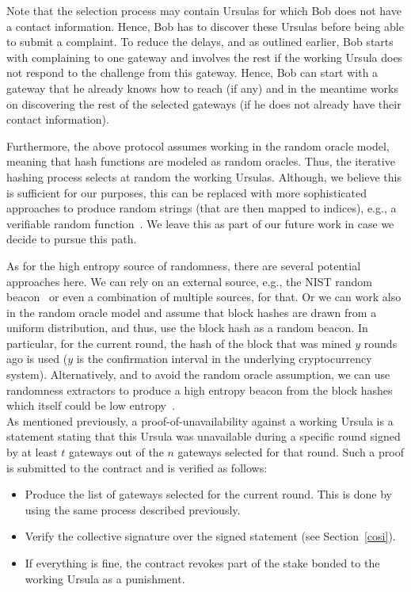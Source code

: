 Note that the selection process may contain Ursulas for which Bob does not have a contact information. Hence, Bob has to discover these Ursulas before being able to submit a complaint. To reduce the delays, and as outlined earlier, Bob starts with complaining to one gateway and involves the rest if the working Ursula does not respond to the challenge from this gateway. Hence, Bob can start with a gateway that he already knows how to reach (if any) and in the meantime works on discovering the rest of the selected gateways (if he does not already have their contact information).


Furthermore, the above protocol assumes working in the random oracle model, meaning that hash functions are modeled as random oracles. Thus, the iterative hashing process selects at random the working Ursulas. Although, we believe this is sufficient for our purposes, this can be replaced with more sophisticated approaches to produce random strings (that are then mapped to indices), e.g., a verifiable random function~\cite{micali1999verifiable}. We leave this as part of our future work in case we decide to pursue this path. 


As for the high entropy source of randomness, there are several potential approaches here. We can rely on an external source, e.g., the NIST random beacon~\cite{nist-beacon} or even a combination of multiple sources, for that. Or we can work also in the random oracle model and assume that block hashes are drawn from a uniform distribution, and thus, use the block hash as a random beacon. In particular, for the current round, the hash of the block that was mined $y$ rounds ago is used ($y$ is the confirmation interval in the underlying cryptocurrency system). Alternatively, and to avoid the random oracle assumption, we can use randomness extractors to produce a high entropy beacon from the block hashes which itself could be low entropy~\cite{bonneau2015bitcoin}. \\


 As mentioned previously, a proof-of-unavailability against a working Ursula is a statement stating that this Ursula was unavailable during a specific round signed by at least $t$ gateways out of the $n$ gateways selected for that round. Such a proof is submitted to the \stakeescrow contract and is verified as follows:
\begin{itemize}
\item Produce the list of gateways selected for the current round. This is done by using the same process described previously.

\item Verify the collective signature over the signed statement (see Section~\ref{cosi}).

\item If everything is fine, the \stakeescrow contract revokes part of the stake bonded to the working Ursula as a punishment.
\end{itemize}


